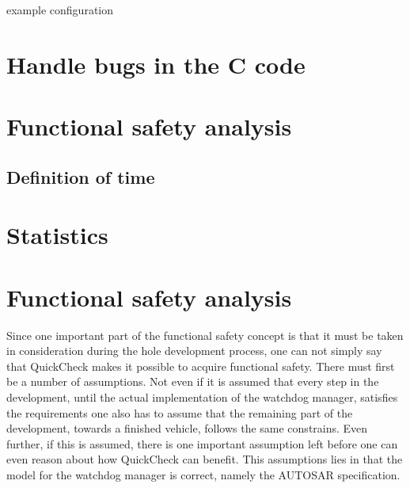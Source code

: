 \begin{table}[!h]
  \caption{example configuration}
  \label{TABLE:STATUSES_EXAMPLE}
  
\end{table}

\section{Handle bugs in the C code}
\label{sec:handlebugs}

\section{Functional safety analysis}
\subsection{Definition of time}
\label{SEC:FUNCTIONAL_SAFETY_TIME}

\section{Statistics}

\section{Functional safety analysis}
Since one important part of the functional safety concept is that it must be
taken in consideration during the hole development process, one can not simply
say that QuickCheck makes it possible to acquire functional safety. There must
first be a number of assumptions. Not even if it is assumed that
every step in the development, until the actual implementation of the watchdog
manager, satisfies the requirements one also has to assume that the remaining
part of the development, towards a finished vehicle, follows the same
constrains. Even further, if this is assumed, there is one important
assumption left before
one can even reason about how QuickCheck can benefit.
This assumptions lies in that the model for the watchdog
manager is correct, namely the AUTOSAR specification.
